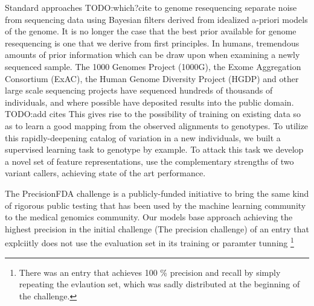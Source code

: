 \documentclass{article}
\begin{document}
Standard approaches TODO:which?cite to genome resequencing separate noise from sequencing data using Bayesian filters derived from idealized a-priori models of the genome.
It is no longer the case that the best prior available for genome resequencing is one that we derive from first principles. 
In humans, tremendous amounts of prior information which can be draw upon when examining a newly sequenced sample. 
The 1000 Genomes Project (1000G), the Exome Aggregation Consortium (ExAC), the Human Genome Diversity Project (HGDP) and other large scale sequencing projects have sequenced hundreds of thousands of individuals, and where possible have deposited results into the public domain. TODO:add cites
This gives rise to the possibility of training on existing data so as to learn a good mapping from the observed alignments to genotypes.
To utilize this rapidly-deepening catalog of variation in a new individuals, we built a supervised learning task to genotype by example.
To attack this task we develop a novel set of feature representations, use the complementary strengths of two variant callers,  achieving state of the art performance.



The PrecisionFDA challenge is a publicly-funded initiative to bring the same kind of rigorous public testing that has been used by the machine learning community to the medical genomics community.
Our models base approach achieving the highest precision in the initial challenge (The precision challenge) of an entry that explciitly does not use the evaluation set in its training or paramter tunning \footnote{ There was an entry that achieves 100 \% precision and recall by simply repeating the evlaution set, which was sadly distributed at the beginning of the challenge.}
\end{document}
